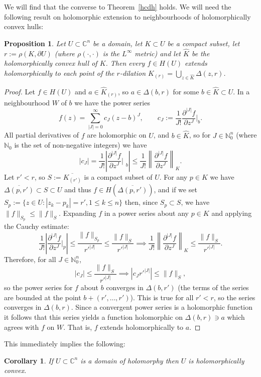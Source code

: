\documentclass[11pt,a4paper, final, twoside]{article}
\newtheorem{corollary}[theorem]{Corollary}
\newtheorem{proposition}[theorem]{Proposition}
\numberwithin{equation}{section}
\newcommand{\C}{\mathbb C}
\newcommand{\N}{\mathbb N}
\newcommand{\clos}[1]{\overline{#1}}
\newcommand{\bd}{\partial}
\newcommand{\pdisc}{\Delta}
\newcommand{\pmetric}{\rho}
\newcommand{\hol}{H}
\newcommand{\dil}[2]{#1_{(#2)}}
\begin{document}
We will find that the converse to Theorem~\ref{hcdh} holds. We will need the following result on holomorphic extension to neighbourhoods
of holomorphically convex hulls:
\begin{proposition}
\label{simultext}
Let $U\subset\C^n$ be a domain, let $K\subset U$ be a compact subset, let $r:=\pmetric(K,\bd U)$ (where $\pmetric(\cdot,\cdot)$ is the $L^\infty$ metric) and let $\hat K$ be the holomorphically convex hull of $K$.
Then every $f\in\hol(U)$ extends holomorphically to each point of the $r$-dilation $\dil{\hat K}{r}=\bigcup_{z\in\hat K}\pdisc(z,r)$.
\end{proposition}
\begin{proof}
Let $f\in\hol(U)$ and $a\in\dil{\hat K}{r}$, so $a\in\pdisc(b,r)$ for some $b\in\hat K\subset U$. In a neighbourhood $W$ of $b$ we have the power series
$$ f(z) = \sum_{|J|=0}^\infty c_J(z-b)^J,\qquad c_J:=\frac{1}{J!}\frac{\partial^{|J|}f}{\partial z^J}\bigg|_b. $$
All partial derivatives of $f$ are holomorphic on $U$, and $b\in\hat K$, so for $J\in\N_0^n$ (where $\N_0$ is the set of non-negative integers) we have
$$ |c_J|=\frac{1}{J!}\left|\frac{\partial^{|J|}f}{\partial z^J}\bigg|_{\phantom{p}\!\!\!b}\right|\leq \frac{1}{J!}\left\|\frac{\partial^{|J|}f}{\partial z^J}\right\|_K. $$
Let $r'<r$, so $S:=\clos{\dil{K}{r'}}$ is a compact subset of $U$. 
For any  $p\in K$ we have $\clos{\pdisc(p,r')}\subset S\subset U$ and thus $f\in\hol(\clos{\pdisc(p,r')})$, and 
if we set $S_{p}:=\{z\in U\colon |z_k-p_k|=r',1\leq k\leq n\}$ then, since $S_p\subset S$, we have $\|f\|_{S_p}\leq \|f\|_S$. Expanding $f$
in a power series about any $p\in K$ and applying the Cauchy estimate:
$$ \frac{1}{J!}\left|\frac{\partial^{|J|}f}{\partial z^J}\bigg|_p\right|\leq \frac{\|f\|_{S_p}}{r'^{|J|}}\leq \frac{\|f\|_S}{r'^{|J|}} \implies \frac{1}{J!}\left\|\frac{\partial^{|J|}f}{\partial z^J}\right\|_K\leq \frac{\|f\|_S}{r'^{|J|}}. $$
Therefore, for all $J\in\N_0^n$,
$$ |c_J|\leq \frac{\|f\|_S}{r'^{|J|}} \implies |c_Jr'^{|J|}|\leq \|f\|_S,$$
so the power series for $f$ about $b$ converges in $\pdisc(b,r')$ (the terms of the series are bounded at the point $b+(r',\dots,r')$). 
This is true for all $r'<r$, so the series converges in $\pdisc(b,r)$. Since
a convergent power series is a holomorphic function it follows that this series yields a function holomorphic on $\pdisc(b,r)\ni a$ which agrees with $f$ on $W$. That is,
$f$ extends holomorphically to $a$.
\end{proof}
This immediately implies the following:
\begin{corollary}
If $U\subset \C^n$ is a domain of holomorphy then $U$ is holomorphically convex.
\end{corollary}
\end{document}
